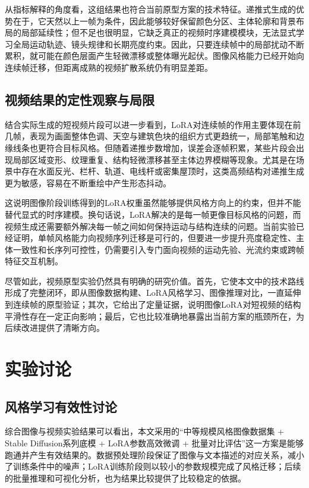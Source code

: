 从指标解释的角度看，这组结果也符合当前原型方案的技术特征。递推式生成的优势在于，它天然以上一帧为条件，因此能够较好保留颜色分区、主体轮廓和背景布局的局部延续性；但不足也很明显，它缺乏真正的视频时序建模模块，无法显式学习全局运动轨迹、镜头规律和长期亮度约束。因此，只要连续帧中的局部扰动不断累积，就可能在颜色层面产生轻微漂移或整体曝光起伏。图像风格能力已经开始向连续帧迁移，但距离成熟的视频扩散系统仍有明显差距。

\subsection{视频结果的定性观察与局限}

结合实际生成的短视频片段可以进一步看到，LoRA对连续帧的作用主要体现在前几帧，表现为画面整体色调、天空与建筑色块的组织方式更趋统一，局部笔触和边缘线条也更符合目标风格。但随着递推步数增加，误差会逐帧积累，某些片段会出现局部区域变形、纹理重复、结构轻微漂移甚至主体边界模糊等现象。尤其是在场景中存在水面反光、栏杆、轨道、电线杆或密集屋顶时，这类高频结构对递推生成更为敏感，容易在不断重绘中产生形态抖动。

这说明图像阶段训练得到的LoRA权重虽然能够提供风格方向上的约束，但并不能替代显式的时序建模。换句话说，LoRA解决的是每一帧更像目标风格的问题，而视频生成还需要额外解决每一帧之间如何保持运动与结构连续的问题。当前实验已经证明，单帧风格能力向视频序列迁移是可行的，但要进一步提升亮度稳定性、主体一致性和长序列可控性，仍需要引入专门面向视频的运动先验、光流约束或跨帧特征交互机制。

尽管如此，视频原型实验仍然具有明确的研究价值。首先，它使本文中的技术路线形成了完整闭环，即从图像数据构建、LoRA风格学习、图像推理对比，一直延伸到连续帧的原型验证；其次，它给出了定量证据，说明图像LoRA对短视频的结构平滑性存在一定正向影响；最后，它也比较准确地暴露出当前方案的瓶颈所在，为后续改进提供了清晰方向。

\section{实验讨论}

\subsection{风格学习有效性讨论}

综合图像与视频实验结果可以看出，本文采用的“中等规模风格图像数据集 + Stable Diffusion系列底模 + LoRA参数高效微调 + 批量对比评估”这一方案是能够跑通并产生有效结果的。数据预处理阶段保证了图像与文本描述的对应关系，减小了训练条件中的噪声；LoRA训练阶段则以较小的参数规模完成了风格迁移；后续的批量推理和可视化分析，也为结果比较提供了比较稳定的依据。

